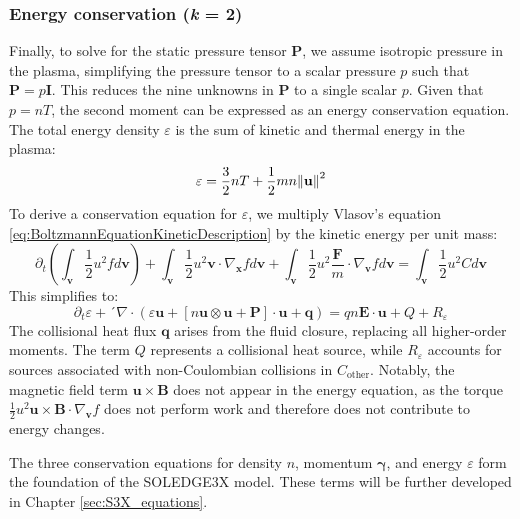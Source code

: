 \subsubsection{Energy conservation (\textit{k} = 2)}
\label{ssec:desc_energyBalance}
Finally, to solve for the static pressure tensor $\boldsymbol{P}$, we assume isotropic pressure in the plasma, simplifying the pressure tensor to a scalar pressure $p$ such that $\boldsymbol{P} = p \boldsymbol{I}$. This reduces the nine unknowns in $\boldsymbol{P}$ to a single scalar $p$. Given that $p = nT$, the second moment can be expressed as an energy conservation equation. The total energy density $\varepsilon$ is the sum of kinetic and thermal energy in the plasma:
\begin{equation}
	\varepsilon = \frac{3}{2} nT + \frac{1}{2} mn \norm{\mathbf{u}}^2
\end{equation}
To derive a conservation equation for $\varepsilon$, we multiply Vlasov's equation \ref{eq:BoltzmannEquationKineticDescription} by the kinetic energy per unit mass:
\begin{equation}
	\partial_t \left( \int_\mathbf{v} \frac{1}{2} u^2 f d\mathbf{v} \right) + \int_\mathbf{v} \frac{1}{2} u^2 \mathbf{v} \cdot \nabla_{\mathbf{x}} f d\mathbf{v} + \int_\mathbf{v} \frac{1}{2} u^2 \frac{\mathbf{F}}{m} \cdot \nabla_{\mathbf{v}} f d\mathbf{v} = \int_\mathbf{v} \frac{1}{2} u^2 C d\mathbf{v}
\end{equation}
This simplifies to:
\begin{equation}
	\label{eq:SecondMomentTransportEquation}
	\partial_t \varepsilon + ´\nabla \cdot \left( \varepsilon \mathbf{u} + \left[ n \mathbf{u} \otimes \mathbf{u} + \boldsymbol{P} \right] \cdot \mathbf{u} + \mathbf{q} \right) = qn \mathbf{E} \cdot \mathbf{u} + Q + R_\varepsilon
\end{equation}
The collisional heat flux $\mathbf{q}$ arises from the fluid closure, replacing all higher-order moments. The term $Q$ represents a collisional heat source, while $R_\varepsilon$ accounts for sources associated with non-Coulombian collisions in $C_{\text{other}}$. Notably, the magnetic field term $\mathbf{u} \times \mathbf{B}$ does not appear in the energy equation, as the torque $\frac{1}{2} u^2 \mathbf{u} \times \mathbf{B} \cdot \nabla_{\mathbf{v}} f$ does not perform work and therefore does not contribute to energy changes. \newline

The three conservation equations for density $n$, momentum $\boldsymbol{\gamma}$, and energy $\varepsilon$ form the foundation of the SOLEDGE3X model. These terms will be further developed in Chapter \ref{sec:S3X_equations}.



